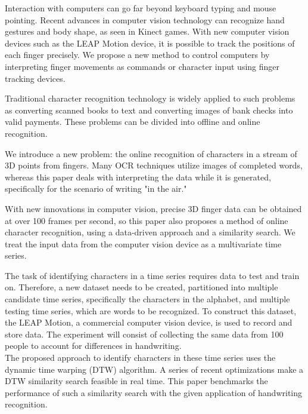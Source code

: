 Interaction with computers can go far beyond keyboard typing and mouse pointing. Recent advances in computer vision technology can recognize hand gestures and body shape, as seen in Kinect games. With new computer vision devices such as the LEAP Motion device, it is possible to track the positions of each finger precisely. We propose a new method to control computers by interpreting finger movements as commands or character input using finger tracking devices. 

Traditional character recognition technology is widely applied to such problems as converting scanned books to text and converting images of bank checks into valid payments. These problems can be divided into offline and online recognition. 

We introduce a new problem: the online recognition of characters in a stream of 3D points from fingers. Many OCR techniques utilize images of completed words, whereas this paper deals with interpreting the data while it is generated, specifically for the scenario of writing "in the air."  

With new innovations in computer vision, precise 3D finger data can be obtained at over 100 frames per second, so this paper also proposes a method of online character recognition, using a data-driven approach and a similarity search. We treat the input data from the computer vision device as a multivariate time series.

The task of identifying characters in a time series requires data to test and train on. Therefore, a new dataset needs to be created, partitioned into multiple candidate time series, specifically the characters in the alphabet, and multiple testing time series, which are words to be recognized. To construct this dataset, the LEAP Motion, a commercial computer vision device, is used to record and store data. The experiment will consist of collecting the same data from 100 people to account for differences in handwriting.\\
The proposed approach to identify characters in these time series uses the dynamic time warping (DTW) algorithm. A series of recent optimizations make a DTW similarity search feasible in real time. This paper benchmarks the performance of such a similarity search with the given application of handwriting recognition.\\
